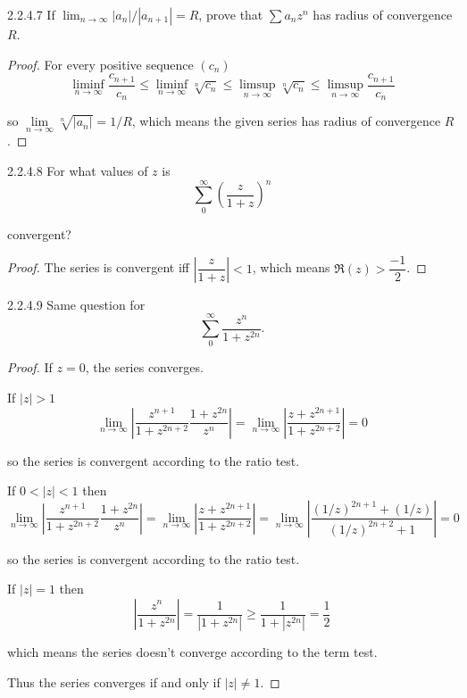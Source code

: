 \begin{problem}{2.2.4.7}
If \( \lim_{n \to \infty} |a_{n}|/|a_{n+1}| = R \), prove that \( \sum a_{n} z^{n} \) has radius of convergence \( R \).
\end{problem}

\begin{proof}
	For every positive sequence \( (c_{n}) \)
	\[
		\liminf\limits_{n\to\infty} \dfrac{c_{n+1}}{c_{n}} \le \liminf\limits_{n\to\infty} \sqrt[n]{c_{n}} \le \limsup\limits_{n\to\infty} \sqrt[n]{c_{n}} \le \limsup\limits_{n\to\infty} \dfrac{c_{n+1}}{c_{n}}
	\]

	so \( \lim\limits_{n\to\infty} \sqrt[n]{\left\vert a_{n} \right\vert} = 1/R \), which means the given series has radius of convergence \( R \).
\end{proof}

\begin{problem}{2.2.4.8}
For what values of \( z \) is
\[
	\sum_{0}^{\infty} {\left( \frac{z}{1+z} \right)}^{n}
\]

convergent?
\end{problem}

\begin{proof}
	The series is convergent iff \( \left\vert \dfrac{z}{1 + z} \right\vert < 1 \), which means \( \Re(z) > \dfrac{-1}{2} \).
\end{proof}

\begin{problem}{2.2.4.9}
Same question for
\[
	\sum_{0}^{\infty} \frac{z^{n}}{1+z^{2n}}.
\]
\end{problem}

\begin{proof}
	If \( z = 0 \), the series converges.

	If \( \left\vert z \right\vert > 1 \)
	\[
		\lim\limits_{n\to\infty} \left\vert \dfrac{z^{n+1}}{1 + z^{2n+2}} \dfrac{1 + z^{2n}}{z^{n}} \right\vert = \lim\limits_{n\to\infty} \left\vert \dfrac{z + z^{2n+1}}{1 + z^{2n+2}} \right\vert = 0
	\]

	so the series is convergent according to the ratio test.

	If \( 0 < \left\vert z \right\vert < 1 \) then
	\[
		\lim\limits_{n\to\infty} \left\vert \dfrac{z^{n+1}}{1 + z^{2n+2}} \dfrac{1 + z^{2n}}{z^{n}} \right\vert = \lim\limits_{n\to\infty} \left\vert \dfrac{z + z^{2n+1}}{1 + z^{2n+2}} \right\vert = \lim\limits_{n\to\infty} \left\vert \dfrac{{(1/z)}^{2n+1} + (1/z)}{{(1/z)}^{2n+2} + 1} \right\vert = 0
	\]

	so the series is convergent according to the ratio test.

	If \( \left\vert z \right\vert = 1 \) then
	\[
		\left\vert \dfrac{z^{n}}{1 + z^{2n}} \right\vert = \dfrac{1}{\left\vert 1 + z^{2n}\right\vert} \ge \dfrac{1}{1 + \left\vert z^{2n}\right\vert} = \dfrac{1}{2}
	\]

	which means the series doesn't converge according to the term test.

	Thus the series converges if and only if \( \left\vert z \right\vert \ne 1 \).
\end{proof}

